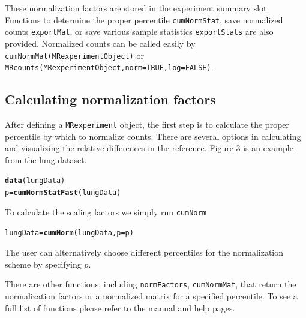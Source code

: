 \documentclass[a4paper,11pt]{article}\usepackage[]{graphicx}\usepackage[]{color}
\makeatletter
\newcommand{\hlstd}[1]{\textcolor[rgb]{0.345,0.345,0.345}{#1}}%
\newcommand{\hlkwb}[1]{\textcolor[rgb]{0.69,0.353,0.396}{#1}}%
\newcommand{\hlkwc}[1]{\textcolor[rgb]{0.333,0.667,0.333}{#1}}%
\newcommand{\hlkwd}[1]{\textcolor[rgb]{0.737,0.353,0.396}{\textbf{#1}}}%
\newenvironment{kframe}{%
 \def\at@end@of@kframe{}%
 \ifinner\ifhmode%
  \def\at@end@of@kframe{\end{minipage}}%
  \begin{minipage}{\columnwidth}%
 \fi\fi%
 \def\FrameCommand##1{\hskip\@totalleftmargin \hskip-\fboxsep
 \colorbox{shadecolor}{##1}\hskip-\fboxsep
     \hskip-\linewidth \hskip-\@totalleftmargin \hskip\columnwidth}%
 \MakeFramed {\advance\hsize-\width
   \@totalleftmargin\z@ \linewidth\hsize
   \@setminipage}}%
 {\par\unskip\endMakeFramed%
 \at@end@of@kframe}
\newenvironment{knitrout}{}{} %
\makeatother
\begin{document}
These normalization factors are stored in the experiment summary slot. Functions to determine the proper percentile \texttt{cumNormStat}, save normalized counts \texttt{exportMat}, or save various sample statistics \texttt{exportStats} are also provided.
Normalized counts can be called easily by \texttt{cumNormMat(MRexperimentObject)} or \texttt{MRcounts(MRexperimentObject,norm=TRUE,log=FALSE)}.

\subsection{Calculating normalization factors}
After defining a \texttt{MRexperiment} object, the first step is to calculate the proper percentile by which to normalize counts. There are several options in calculating and visualizing the relative differences in the reference. Figure 3 is an example from the lung dataset.

\begin{knitrout}
\color{fgcolor}\begin{kframe}
\begin{alltt}
\hlkwd{data}\hlstd{(lungData)}
\hlstd{p} \hlkwb{=} \hlkwd{cumNormStatFast}\hlstd{(lungData)}
\end{alltt}
\end{kframe}
\end{knitrout}


\noindent
To calculate the scaling factors we simply run \texttt{cumNorm}

\begin{knitrout}
\color{fgcolor}\begin{kframe}
\begin{alltt}
\hlstd{lungData} \hlkwb{=} \hlkwd{cumNorm}\hlstd{(lungData,} \hlkwc{p} \hlstd{= p)}
\end{alltt}
\end{kframe}
\end{knitrout}


The user can alternatively choose different percentiles for the normalization scheme by specifying $p$.

There are other functions, including \texttt{normFactors}, \texttt{cumNormMat}, that return the normalization factors or a normalized matrix for a specified percentile. To see a full list of functions please refer to the manual and help pages. 
\end{document}
